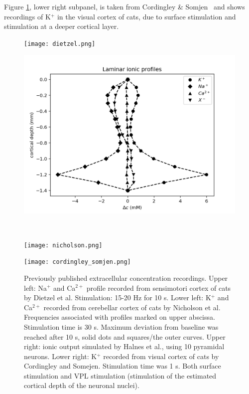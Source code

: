\documentclass{uiophd}
\begin{document}
Figure \ref{fig:data sets}, lower right subpanel, is taken from Cordingley \& Somjen~\cite{CordingleySomjen} and shows recordings of K$^+$ in the visual cortex of cats, due to surface stimulation and stimulation at a deeper cortical layer. 
\begin{figure}[!tbp]
  \centering
  \begin{minipage}[b]{0.475\textwidth}
    \texttt{[image: dietzel.png]}
  \end{minipage}
  \hfill
  \begin{minipage}[b]{0.475\textwidth}
    \includegraphics[width=\textwidth]{laminar_profile_Halnes.png}
  \end{minipage}
  \\
  \vspace{0.05\textwidth}
  \begin{minipage}[b]{0.475\textwidth}
    \texttt{[image: nicholson.png]}
  \end{minipage}
  \hfill
  \begin{minipage}[b]{0.475\textwidth}
    \texttt{[image: cordingley\_somjen.png]}
  \end{minipage}
  \caption{Previously published extracellular concentration recordings. Upper left: Na$^+$ and Ca$^{2+}$ profile recorded from sensimotori cortex of cats by Dietzel et al. Stimulation: 15-20 Hz for 10 s. Lower left: K$^+$ and Ca$^{2+}$  recorded from cerebellar cortex of cats by Nicholson et al. Frequencies associated with profiles marked on upper abscissa. Stimulation time is 30 s. Maximum deviation from baseline was reached after 10 s, solid dots and squares/the outer curves. Upper right: ionic output simulated by Halnes et al., using 10 pyramidal neurons. Lower right: K$^+$ recorded from visual cortex of cats by Cordingley and Somejen. Stimulation time was 1 s. Both surface stimulation and VPL stimulation (stimulation of the estimated cortical depth of the neuronal nuclei).
}
  \label{fig:data sets}
\end{figure} 
\end{document}
